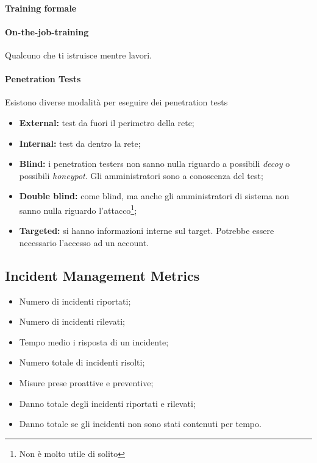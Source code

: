 \paragraph*{Training formale}

\paragraph*{On-the-job-training} Qualcuno che ti istruisce mentre lavori.


\paragraph*{Penetration Tests} Esistono diverse modalità per eseguire dei
penetration tests
\begin{itemize}
\item \textbf{External:} test da fuori il perimetro della rete;
\item \textbf{Internal:} test da dentro la rete;
\item \textbf{Blind:} i penetration testers non sanno nulla riguardo a possibili
\textit{decoy} o possibili \textit{honeypot}. Gli amministratori sono a
conoscenza del test;
\item \textbf{Double blind:} come blind, ma anche gli amministratori di sistema non sanno
nulla riguardo l'attacco\footnote{Non è molto utile di solito};
\item \textbf{Targeted:} si hanno informazioni interne sul target. Potrebbe essere 
necessario l'accesso ad un account.
\end{itemize}

\subsection{Incident Management Metrics}

\begin{itemize}
\item Numero di incidenti riportati;
\item Numero di incidenti rilevati;
\item Tempo medio i risposta di un incidente;
\item Numero totale di incidenti risolti;
\item Misure prese proattive e preventive;
\item Danno totale degli incidenti riportati e rilevati;
\item Danno totale se gli incidenti non sono stati contenuti per tempo.
\end{itemize}

